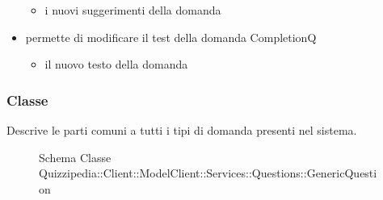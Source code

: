 \begin{itemize}
\newline
\begin{itemize}
\item {}
\newline
i nuovi suggerimenti della domanda
\end{itemize}
\item {}
\newline
permette di modificare il test della domanda CompletionQ
\newline
{}
\newline
\begin{itemize}
\item {}
\newline
il nuovo testo della domanda
\end{itemize}
\end{itemize}
\subsubsection{Classe }
Descrive le parti comuni a tutti i tipi di domanda presenti nel sistema.
\begin{figure}[H]
\centering
\noindent{}
\caption[Schema Classe GenericQuestion]{Schema Classe Quizzipedia::Client::ModelClient::Services::Questions::GenericQuestion}
\end{figure}
